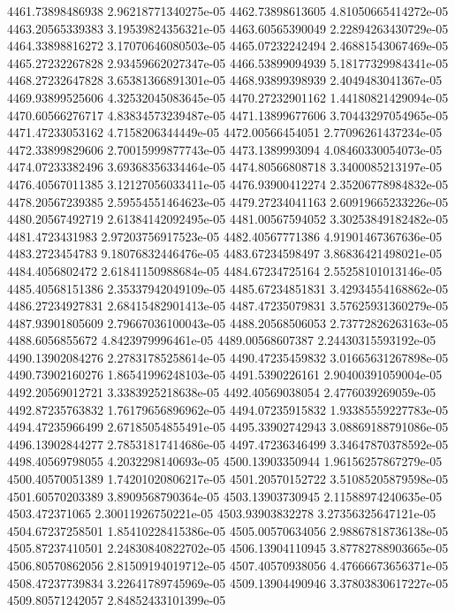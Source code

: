 {4461.73898486938 2.96218771340275e-05
4462.73898613605 4.81050665414272e-05
4463.20565339383 3.19539824356321e-05
4463.60565390049 2.22894263430729e-05
4464.33898816272 3.17070646080503e-05
4465.07232242494 2.46881543067469e-05
4465.27232267828 2.93459662027347e-05
4466.53899094939 5.18177329984341e-05
4468.27232647828 3.65381366891301e-05
4468.93899398939 2.4049483041367e-05
4469.93899525606 4.32532045083645e-05
4470.27232901162 1.44180821429094e-05
4470.60566276717 4.83834573239487e-05
4471.13899677606 3.70443297054965e-05
4471.47233053162 4.7158206344449e-05
4472.00566454051 2.77096261437234e-05
4472.33899829606 2.70015999877743e-05
4473.1389993094 4.08460330054073e-05
4474.07233382496 3.69368356334464e-05
4474.80566808718 3.3400085213197e-05
4476.40567011385 3.12127056033411e-05
4476.93900412274 2.35206778984832e-05
4478.20567239385 2.59554551464623e-05
4479.27234041163 2.60919665233226e-05
4480.20567492719 2.61384142092495e-05
4481.00567594052 3.30253849182482e-05
4481.4723431983 2.97203756917523e-05
4482.40567771386 4.91901467367636e-05
4483.2723454783 9.18076832446476e-05
4483.67234598497 3.86836421498021e-05
4484.4056802472 2.61841150988684e-05
4484.67234725164 2.55258101013146e-05
4485.40568151386 2.35337942049109e-05
4485.67234851831 3.42934554168862e-05
4486.27234927831 2.68415482901413e-05
4487.47235079831 3.57625931360279e-05
4487.93901805609 2.79667036100043e-05
4488.20568506053 2.73772826263163e-05
4488.6056855672 4.8423979996461e-05
4489.00568607387 2.24430315593192e-05
4490.13902084276 2.27831785258614e-05
4490.47235459832 3.01665631267898e-05
4490.73902160276 1.86541996248103e-05
4491.5390226161 2.90400391059004e-05
4492.20569012721 3.3383925218638e-05
4492.40569038054 2.4776039269059e-05
4492.87235763832 1.76179656896962e-05
4494.07235915832 1.93385559227783e-05
4494.47235966499 2.67185054855491e-05
4495.33902742943 3.08869188791086e-05
4496.13902844277 2.78531817414686e-05
4497.47236346499 3.34647870378592e-05
4498.40569798055 4.2032298140693e-05
4500.13903350944 1.96156257867279e-05
4500.40570051389 1.74201020806217e-05
4501.20570152722 3.51085205879598e-05
4501.60570203389 3.8909568790364e-05
4503.13903730945 2.11588974240635e-05
4503.472371065 2.30011926750221e-05
4503.93903832278 3.27356325647121e-05
4504.67237258501 1.85410228415386e-05
4505.00570634056 2.98867818736138e-05
4505.87237410501 2.24830840822702e-05
4506.13904110945 3.87782788903665e-05
4506.80570862056 2.81509194019712e-05
4507.40570938056 4.47666673656371e-05
4508.47237739834 3.22641789745969e-05
4509.13904490946 3.37803830617227e-05
4509.80571242057 2.84852433101399e-05
}
